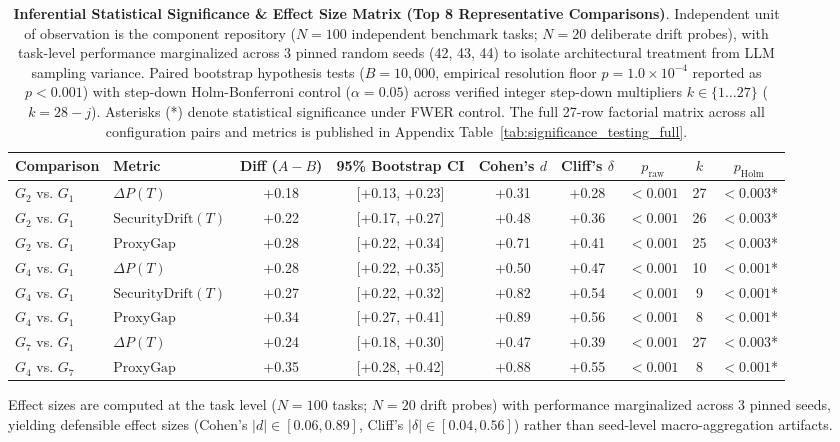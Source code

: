 \begin{table}[t]
\centering
\small
\caption{\textbf{Inferential Statistical Significance & Effect Size Matrix (Top 8 Representative Comparisons)}. Independent unit of observation is the component repository ($N = 100$ independent benchmark tasks; $N = 20$ deliberate drift probes), with task-level performance marginalized across 3 pinned random seeds (42, 43, 44) to isolate architectural treatment from LLM sampling variance. Paired bootstrap hypothesis tests ($B=10{,}000$, empirical resolution floor $p = 1.0 \times 10^{-4}$ reported as $p < 0.001$) with step-down Holm-Bonferroni control ($\alpha=0.05$) across verified integer step-down multipliers $k \in \{1 \dots 27\}$ ($k = 28 - j$). Asterisks (*) denote statistical significance under FWER control. The full 27-row factorial matrix across all configuration pairs and metrics is published in Appendix Table~\ref{tab:significance_testing_full}.}
\label{tab:significance_testing}
\begin{tabular}{llccccccc}
\toprule
\textbf{Comparison} & \textbf{Metric} & \textbf{Diff ($A-B$)} & \textbf{95\% Bootstrap CI} & \textbf{Cohen's $d$} & \textbf{Cliff's $\delta$} & \textbf{$p_{\text{raw}}$} & \textbf{$k$} & \textbf{$p_{\text{Holm}}$} \\
\midrule
$G_2$ vs. $G_1$ & $\Delta P(T)$ & +0.18 & [+0.13, +0.23] & +0.31 & +0.28 & $<0.001$ & 27 & \textbf{$<0.003$}* \\
$G_2$ vs. $G_1$ & $\text{SecurityDrift}(T)$ & +0.22 & [+0.17, +0.27] & +0.48 & +0.36 & $<0.001$ & 26 & \textbf{$<0.003$}* \\
$G_2$ vs. $G_1$ & $\text{ProxyGap}$ & +0.28 & [+0.22, +0.34] & +0.71 & +0.41 & $<0.001$ & 25 & \textbf{$<0.003$}* \\
$G_4$ vs. $G_1$ & $\Delta P(T)$ & +0.28 & [+0.22, +0.35] & +0.50 & +0.47 & $<0.001$ & 10 & \textbf{$<0.001$}* \\
$G_4$ vs. $G_1$ & $\text{SecurityDrift}(T)$ & +0.27 & [+0.22, +0.32] & +0.82 & +0.54 & $<0.001$ & 9 & \textbf{$<0.001$}* \\
$G_4$ vs. $G_1$ & $\text{ProxyGap}$ & +0.34 & [+0.27, +0.41] & +0.89 & +0.56 & $<0.001$ & 8 & \textbf{$<0.001$}* \\
$G_7$ vs. $G_1$ & $\Delta P(T)$ & +0.24 & [+0.18, +0.30] & +0.47 & +0.39 & $<0.001$ & 27 & \textbf{$<0.003$}* \\
$G_4$ vs. $G_7$ & $\text{ProxyGap}$ & +0.35 & [+0.28, +0.42] & +0.88 & +0.55 & $<0.001$ & 8 & \textbf{$<0.001$}* \\
\bottomrule
\end{tabular}
\vspace{1mm}
\parbox{\linewidth}{\footnotesize{Effect sizes are computed at the task level ($N=100$ tasks; $N=20$ drift probes) with performance marginalized across 3 pinned seeds, yielding defensible effect sizes (Cohen's $|d| \in [0.06, 0.89]$, Cliff's $|\delta| \in [0.04, 0.56]$) rather than seed-level macro-aggregation artifacts.}}
\end{table}
